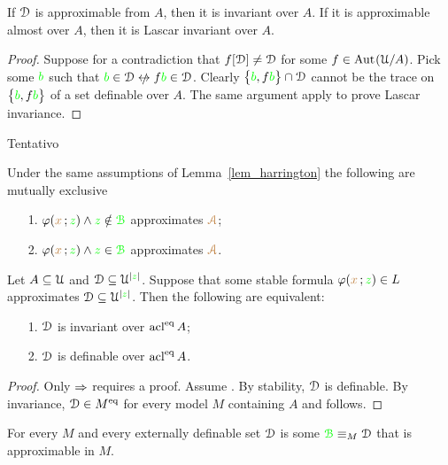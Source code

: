 \documentclass[creche.tex]{subfiles}
\begin{document}
{\begin{proposition}
If\/ $\EuScript D$ is\/ approximable from $A$, then it is invariant over $A$. If it is\/ ap\-prox\-i\-ma\-ble almost over $A$, then it is Lascar invariant over $A$.
\end{proposition}

\begin{proof}
Suppose for a contradiction that $f[\EuScript D]\neq\EuScript D$ for some $f\in\textrm{Aut\kern.15ex}(\EuScript U/A)$. Pick some ${\color{green} b}$ such that ${\gr b}\in\D\niff f{\gr b}\in\D$. Clearly $\big\{{\color{green} b},f{\color{green} b}\big\}\cap\EuScript D$ cannot be the trace on $\big\{{\color{green} b},f{\color{green} b}\big\}$ of a set definable over $A$. The same argument apply to prove Lascar invariance.
\end{proof}

Tentativo


\begin{corollary}
Under the same assumptions of Lemma~\ref{lem_harrington} the following are mutually exclusive\nobreak
\begin{itemize}
\item[1.] $\varphi({\color{brown} x}\,;{\color{green} z})\wedge{\color{green}z}\notin{{\color{green}{\EuScript B}}}$ approximates ${\color{brown}{\EuScript A}}$;
\item[2.] $\varphi({\color{brown} x}\,;{\color{green} z})\wedge{\color{green}z}\in{{\color{green}{\EuScript B}}}$ approximates ${\color{brown}{\EuScript A}}$.\QED
\end{itemize}
\end{corollary}

}

\begin{proposition}
Let $A\subseteq\EuScript U$ and $\EuScript D\subseteq\EuScript U^{|{\color{green} z}|}$. Suppose that some stable formula $\varphi({\color{brown} x}\,;{\color{green} z})\in L$ approximates $\EuScript D\subseteq\EuScript U^{|{\color{green} z}|}$. Then the following are equivalent:
\begin{itemize}
\item[1.] $\EuScript D$ is invariant over $\mathop{\rm acl}^{{\rm eq}} A$;
\item[2.] $\EuScript D$ is definable over $\mathop{\rm acl}^{{\rm eq}} A$.
\end{itemize}
\end{proposition}

\begin{proof}
Only $\Rightarrow$ requires a proof. Assume . By stability, $\EuScript D$ is definable. By invariance, $\EuScript D\in M^{{\rm eq}}$ for every model $M$ containing $A$ and  follows.
\end{proof}


\begin{proposition}
For every $M$ and every externally definable set $\EuScript D$ is some ${\color{green}{\EuScript B}}\equiv_M\EuScript D$ that is approximable in $M$. 
\end{proposition}
\end{document}
